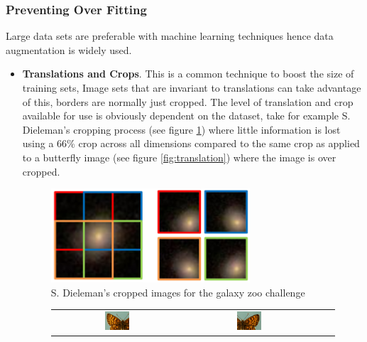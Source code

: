 \documentclass[11pt, titlepage, oneside]{article}
\theoremstyle{plain}
\theoremstyle{definition}
\theoremstyle{remark}
\begin{document}
		\subsubsection{Preventing Over Fitting}
			\label{subsec:overfitting}
			Large data sets are preferable with machine learning techniques hence data augmentation is widely used\cite{zoo, imagenet}. 
			\begin{itemize}
				\item \textbf{Translations and Crops}. This is a common technique\cite{zoo, imagenet} to boost the size of training sets, Image sets that are invariant to translations can take advantage of this, borders are normally just cropped. The level of translation and crop available for use is obviously dependent on the dataset, take for example S. Dieleman's cropping process (see figure \ref{fig:zooimage}) where little information is lost using a 66\% crop across all dimensions compared to the same crop as applied to a butterfly image (see figure \ref{fig:translation}) where the image is over cropped.
				\begin{figure}[H]
					\centering
						\includegraphics[width=0.7\textwidth]{zoo.png}
				\caption{S. Dieleman's cropped images for the galaxy zoo challenge\cite{zoo}}
				\label{fig:zooimage}
				\end{figure}
				\begin{figure}[H]
					\centering
						\begin{tabular}{c c c c}
						\includegraphics[width=0.2\textwidth]{Melitaea-athalia-08-01.jpg} &
						\includegraphics[width=0.2\textwidth]{Melitaea-athalia-08-02.jpg} &

\end{tabular}
\end{figure}
\end{itemize}
\end{document}

